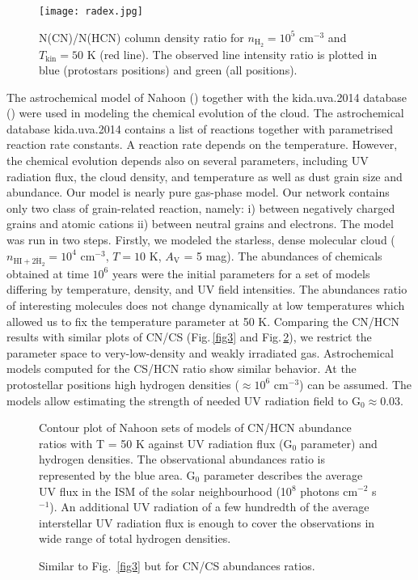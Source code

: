 \documentclass[a4paper]{article}
\begin{document}
\begin{figure}[!h]
\centering
\texttt{[image: radex.jpg]}
\caption{N(CN)/N(HCN) column density ratio for $n_\mathrm{H_2} = 10^5$ cm$^{-3}$ and $T_\mathrm{kin} = 50$ K (red line). The observed line intensity ratio is plotted in blue (protostars positions) and green (all positions).}\label{fig2}
\end{figure}

\indent \indent The astrochemical model of Nahoon (\cite{wakelam2012}) together with the kida.uva.2014 database (\cite{wakelam2015}) were used in modeling the chemical evolution of the cloud. The astrochemical database kida.uva.2014 contains a list of reactions together with parametrised reaction rate constants. A reaction rate depends on the temperature. However, the chemical evolution depends also on several parameters, including UV radiation flux, the cloud density, and temperature as well as dust grain size and abundance. Our model is nearly pure gas-phase model. Our network contains only two class of grain-related reaction, namely: i) between negatively charged grains and atomic cations ii) between neutral grains and electrons. The model was run in two steps. Firstly, we modeled the starless, dense molecular cloud ($n_\mathrm{HI+2 \dot H_2} = 10^4$ cm$^{-3}$, $T = 10$ K, $A_\mathrm{V}$ = 5 mag). The abundances of chemicals obtained at time $10^6$ years were the initial parameters for a set of models differing by temperature, density, and UV field intensities. The abundances ratio of interesting molecules does not change dynamically at low temperatures which allowed us to fix the temperature parameter at 50 K. Comparing the CN/HCN results with similar plots of CN/CS (Fig.\,\ref{fig3} and Fig.\,\ref{fig4}), we restrict the parameter space to very-low-density and weakly irradiated gas. Astrochemical models computed for the CS/HCN ratio show similar behavior. At the protostellar positions high hydrogen densities ($\approx 10^6$ cm$^{-3}$) can be assumed. The models allow estimating the strength of needed UV radiation field to G$_0 \approx 0.03$. 

\begin{figure}[!h]
\centering
\begin{minipage}[t]{.45\linewidth}
\centering
{}
\caption{Contour plot of Nahoon sets of models of CN/HCN abundance ratios with T = 50 K against UV radiation flux (G$_0$ parameter) and hydrogen densities. The observational abundances ratio is represented by the blue area. G$_0$ parameter describes the average UV flux in the ISM of the solar neighbourhood (10$^8$ photons cm$^{−2}$ s$^{−1}$). An additional UV radiation of a few hundredth of the average interstellar UV radiation flux is enough to cover the observations in wide range of total hydrogen densities.}\label{fig3}
\end{minipage}
\hfill
\begin{minipage}[t]{.45\linewidth}
\centering
{}
\caption{Similar to Fig.~\ref{fig3} but for CN/CS abundances ratios.}\label{fig4}
\end{minipage}
\end{figure}
\end{document}
